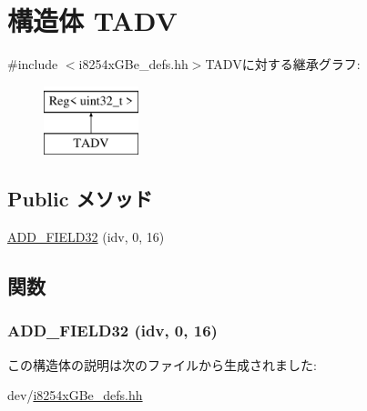 \hypertarget{structiGbReg_1_1Regs_1_1TADV}{
\section{構造体 TADV}
\label{structiGbReg_1_1Regs_1_1TADV}
}


{\ttfamily \#include $<$i8254xGBe\_\-defs.hh$>$}TADVに対する継承グラフ:\begin{figure}[H]
\begin{center}
\leavevmode
\includegraphics[height=2cm]{structiGbReg_1_1Regs_1_1TADV}
\end{center}
\end{figure}
\subsection*{Public メソッド}
\begin{DoxyCompactItemize}
\item 
\hyperlink{structiGbReg_1_1Regs_1_1TADV_adf6e0b872721f8ffd2f16c12a1b68e84}{ADD\_\-FIELD32} (idv, 0, 16)
\end{DoxyCompactItemize}


\subsection{関数}
\hypertarget{structiGbReg_1_1Regs_1_1TADV_adf6e0b872721f8ffd2f16c12a1b68e84}{
\subsubsection[{ADD\_\-FIELD32}]{\setlength{\rightskip}{0pt plus 5cm}ADD\_\-FIELD32 (idv, \/  0, \/  16)}}
\label{structiGbReg_1_1Regs_1_1TADV_adf6e0b872721f8ffd2f16c12a1b68e84}


この構造体の説明は次のファイルから生成されました:\begin{DoxyCompactItemize}
\item 
dev/\hyperlink{i8254xGBe__defs_8hh}{i8254xGBe\_\-defs.hh}\end{DoxyCompactItemize}
